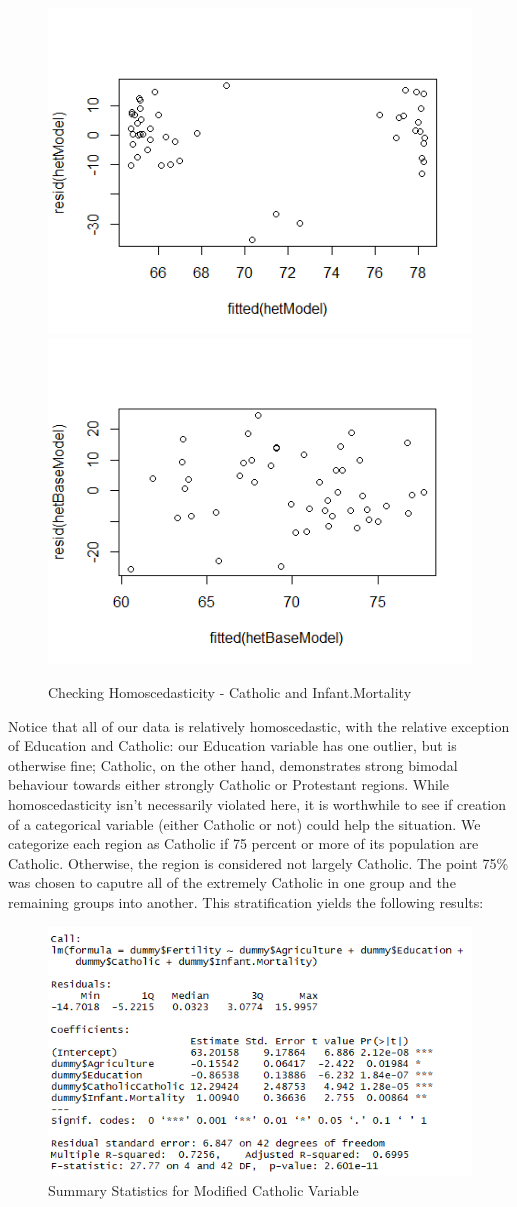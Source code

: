 \documentclass[preprint,12pt]{elsarticle}
\begin{document}
\newpage

\begin{figure}[htp]
\includegraphics[width=.4\textwidth]{homoFertCath}\hfill
\includegraphics[width=.4\textwidth]{homoFertMort}
\caption{Checking Homoscedasticity - Catholic and Infant.Mortality}

\end{figure}

\noindent Notice that all of our data is relatively homoscedastic, with the relative exception of Education and Catholic: our Education variable has one outlier, but is otherwise fine; Catholic, on the other hand, demonstrates strong bimodal behaviour towards either strongly Catholic or Protestant regions. While homoscedasticity isn't necessarily violated here, it is worthwhile to see if creation of a categorical variable (either Catholic or not) could help the situation. We categorize each region as Catholic if 75 percent or more of its population are Catholic. Otherwise, the region is considered not largely Catholic. The point 75\% was chosen to caputre all of the extremely Catholic in one group and the remaining groups into another. This stratification yields the following results:

\begin{figure}[h!]
\centering\includegraphics[width=0.7\linewidth]{SUmmaryStatsEndModel}
\caption{Summary Statistics for Modified Catholic Variable}
\end{figure}
\end{document}
